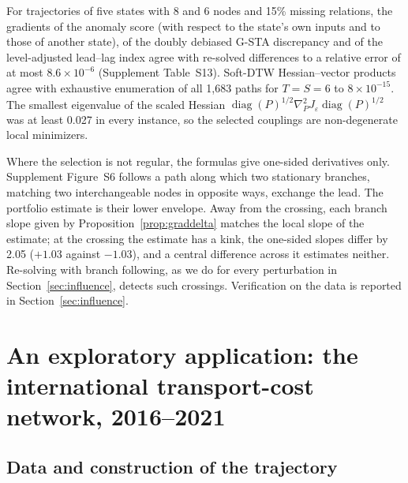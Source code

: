 \documentclass[12pt]{article}
\theoremstyle{definition}
\begin{document}
For trajectories of five states with 8 and 6 nodes and 15\% missing relations, the gradients of the anomaly score (with respect to the state's own inputs and to those of another state), of the doubly debiased G-STA discrepancy and of the level-adjusted lead--lag index agree with re-solved differences to a relative error of at most $8.6\times10^{-6}$ (Supplement Table~S13). Soft-DTW Hessian--vector products agree with exhaustive enumeration of all 1{,}683 paths for $T=S=6$ to $8\times10^{-15}$. The smallest eigenvalue of the scaled Hessian $\operatorname{diag}(P)^{1/2}\nabla^2_PJ_\varepsilon\operatorname{diag}(P)^{1/2}$ was at least 0.027 in every instance, so the selected couplings are non-degenerate local minimizers.

Where the selection is not regular, the formulas give one-sided derivatives only. Supplement Figure~S6 follows a path along which two stationary branches, matching two interchangeable nodes in opposite ways, exchange the lead. The portfolio estimate is their lower envelope. Away from the crossing, each branch slope given by Proposition~\ref{prop:graddelta} matches the local slope of the estimate; at the crossing the estimate has a kink, the one-sided slopes differ by 2.05 ($+1.03$ against $-1.03$), and a central difference across it estimates neither. Re-solving with branch following, as we do for every perturbation in Section~\ref{sec:influence}, detects such crossings. Verification on the data is reported in Section~\ref{sec:influence}.

\section{An exploratory application: the international transport-cost network, 2016--2021}
\label{sec:app}

\subsection{Data and construction of the trajectory}
\end{document}
